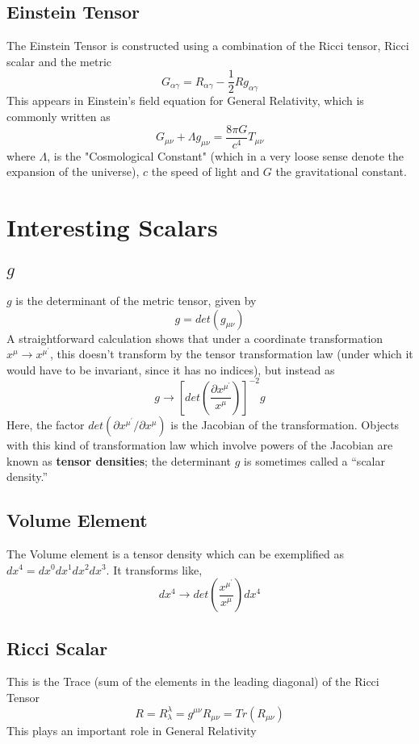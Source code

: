 \subsection{Einstein Tensor}
The Einstein Tensor is constructed using a combination of the Ricci tensor, Ricci scalar and the metric
\begin{equation}
	G_{\alpha \gamma} = R_{\alpha \gamma} - \frac{1}{2}R g_{\alpha \gamma}
\end{equation}
This appears in Einstein's field equation for General Relativity, which is commonly written as
\begin{equation}
G_{\mu \nu} + \Lambda g_{\mu \nu} = \frac{8 \pi G}{c^{4}} T_{\mu \nu}
\end{equation}
where $\Lambda$, is the "Cosmological Constant" (which in a very loose sense denote the expansion of the universe), $c$ the speed of light and $G$ the gravitational constant.
\section{Interesting Scalars}
\subsection{$g$}
$g$ is the determinant of the metric tensor, given by
\begin{equation}
g = det(g_{\mu \nu})
\end{equation}
A straightforward calculation shows that under a coordinate transformation $x^{\mu} \rightarrow x^{\mu^{'}}$, this
doesn’t transform by the tensor transformation law (under which it would have to be invariant, since it has no indices), but instead as
\begin{equation}
	g \rightarrow  \left[det \left(\frac{\partial x^{\mu^{\prime}}}{x^{\mu}} \right) \right]^{-2} g
\end{equation}
Here, the factor $det(\partial x^{\mu^{'}}/\partial x^{\mu})$ is the Jacobian of the transformation. Objects with this kind of transformation law which involve powers of the Jacobian are known as \textbf{tensor densities}; the determinant $g$ is sometimes called a “scalar density.”
\subsection{Volume Element}
The Volume element is a tensor density which can be exemplified as $dx^{4} = dx^{0}dx^{1}dx^{2}dx^{3}$. It transforms like,
\begin{equation}
dx^{4} \rightarrow det \left(\frac{x^{\mu^{\prime}}}{x^{\mu}} \right) dx^{4}
\end{equation}
\subsection{Ricci Scalar}
This is the Trace (sum of the elements in the leading diagonal) of the Ricci Tensor
\begin{equation}
R = R^{\lambda}_{\lambda} = g^{\mu \nu}R_{\mu \nu} = Tr(R_{\mu \nu})
\end{equation}
This plays an important role in General Relativity
